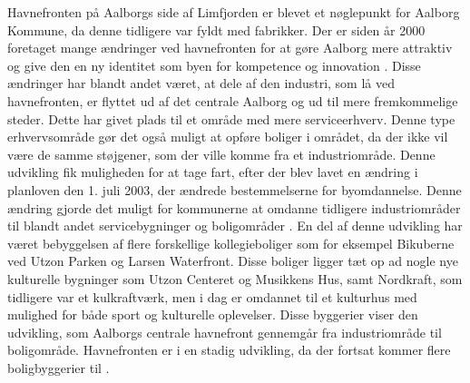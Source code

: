 \newline \indent{     }  Havnefronten på Aalborgs side af Limfjorden er blevet et nøglepunkt for Aalborg Kommune, da denne tidligere var fyldt med fabrikker. Der er siden år 2000 foretaget mange ændringer ved havnefronten for at gøre Aalborg mere attraktiv og give den en ny identitet som byen for kompetence og innovation \citep{brughavnen}.
\newline \indent{     }  Disse ændringer har blandt andet været, at dele af den industri, som lå ved havnefronten, er flyttet ud af det centrale Aalborg og ud til mere fremkommelige steder. Dette har givet plads til et område med mere serviceerhverv. Denne type erhvervsområde gør det også muligt at opføre boliger i området, da der ikke vil være de samme støjgener, som der ville komme fra et industriområde. Denne udvikling fik muligheden for at tage fart, efter der blev lavet en ændring i planloven den 1. juli 2003, der ændrede bestemmelserne for byomdannelse. Denne ændring gjorde det muligt for kommunerne at omdanne tidligere industriområder til blandt andet servicebygninger og boligområder \citep{sort}.
En del af denne udvikling har været bebyggelsen af flere forskellige kollegieboliger som for eksempel Bikuberne ved Utzon Parken og Larsen Waterfront. Disse boliger ligger tæt op ad nogle nye kulturelle bygninger som Utzon Centeret og Musikkens Hus, samt Nordkraft, som tidligere var et kulkraftværk, men i dag er omdannet til et kulturhus med mulighed for både sport og kulturelle oplevelser. Disse byggerier viser den udvikling, som Aalborgs centrale havnefront gennemgår fra industriområde til boligområde. Havnefronten er i en stadig udvikling, da der fortsat kommer flere boligbyggerier til \citep{havnefronterne}.

